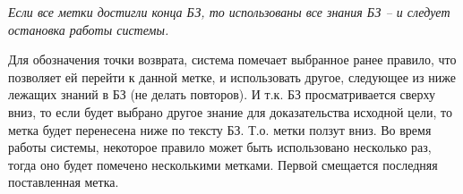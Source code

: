 \documentclass[a4paper,12pt]{article}
\begin{document}
\textit{Если все метки достигли конца БЗ, то использованы все знания БЗ – и следует остановка работы системы.}

Для обозначения точки возврата, система помечает выбранное ранее правило, что позволяет ей перейти к данной метке, и использовать другое, следующее из ниже лежащих знаний в БЗ (не делать повторов). И т.к. БЗ просматривается сверху вниз, то если будет выбрано другое знание для доказательства исходной цели, то метка будет перенесена ниже по тексту БЗ. Т.о. метки ползут вниз. Во время работы системы, некоторое правило может быть использовано несколько раз, тогда оно будет помечено несколькими метками. Первой смещается последняя поставленная метка. 
\end{document}
